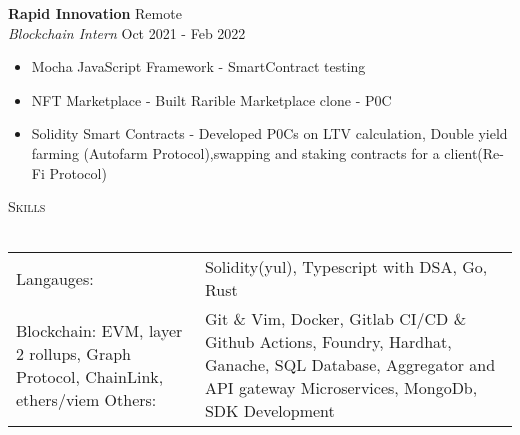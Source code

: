 \documentclass[a4paper]{article}
\newcommand{\lineunder} {
    \vspace*{-8pt} \\
    \hspace*{-18pt} \hrulefill \\
}
\newcommand{\header} [1] {
    {\hspace*{-18pt}\vspace*{6pt} \textsc{#1}}
    \vspace*{-6pt} \lineunder
}
\begin{document}
\textbf{Rapid Innovation} \hfill Remote\\
\textit{Blockchain Intern} \hfill Oct 2021 - Feb 2022\\
\vspace{-1mm}
\begin{itemize} \itemsep 1pt
	\item Mocha JavaScript Framework - SmartContract testing
	\item NFT Marketplace - Built Rarible Marketplace clone - P0C
    \item Solidity Smart Contracts - Developed P0Cs on LTV calculation, Double yield farming (Autofarm Protocol),swapping and staking contracts for a client(Re-Fi Protocol)
\end{itemize}

\header{Skills}
\begin{tabularx}{\textwidth}{ l X } 
	Langauges:  & Solidity(yul), Typescript with DSA, Go, Rust\\
    Blockchain: EVM, layer 2 rollups, Graph Protocol, ChainLink, ethers/viem
	Others:     & Git \& Vim, Docker, Gitlab CI/CD \& Github Actions, Foundry, Hardhat, Ganache, SQL Database, Aggregator and API gateway Microservices, MongoDb, SDK Development \\
\end{tabularx}
\vspace{2mm}
\end{document}

